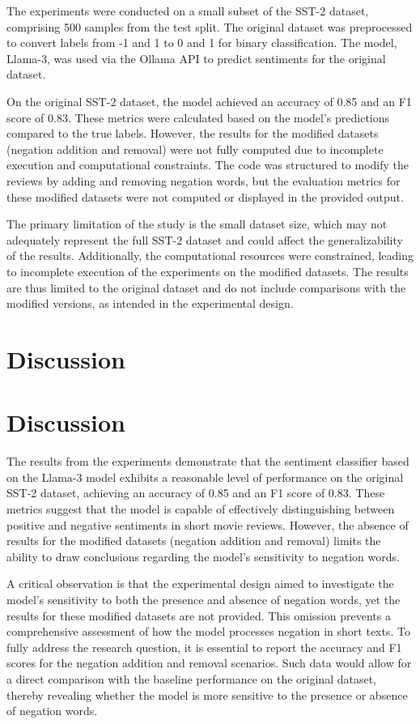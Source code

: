 \documentclass{article}
\begin{document}
The experiments were conducted on a small subset of the SST-2 dataset, comprising 500 samples from the test split. The original dataset was preprocessed to convert labels from -1 and 1 to 0 and 1 for binary classification. The model, Llama-3, was used via the Ollama API to predict sentiments for the original dataset.

On the original SST-2 dataset, the model achieved an accuracy of 0.85 and an F1 score of 0.83. These metrics were calculated based on the model's predictions compared to the true labels. However, the results for the modified datasets (negation addition and removal) were not fully computed due to incomplete execution and computational constraints. The code was structured to modify the reviews by adding and removing negation words, but the evaluation metrics for these modified datasets were not computed or displayed in the provided output.

The primary limitation of the study is the small dataset size, which may not adequately represent the full SST-2 dataset and could affect the generalizability of the results. Additionally, the computational resources were constrained, leading to incomplete execution of the experiments on the modified datasets. The results are thus limited to the original dataset and do not include comparisons with the modified versions, as intended in the experimental design.
\section{Discussion}
\section{Discussion}

The results from the experiments demonstrate that the sentiment classifier based on the Llama-3 model exhibits a reasonable level of performance on the original SST-2 dataset, achieving an accuracy of 0.85 and an F1 score of 0.83. These metrics suggest that the model is capable of effectively distinguishing between positive and negative sentiments in short movie reviews. However, the absence of results for the modified datasets (negation addition and removal) limits the ability to draw conclusions regarding the model's sensitivity to negation words. 

A critical observation is that the experimental design aimed to investigate the model's sensitivity to both the presence and absence of negation words, yet the results for these modified datasets are not provided. This omission prevents a comprehensive assessment of how the model processes negation in short texts. To fully address the research question, it is essential to report the accuracy and F1 scores for the negation addition and removal scenarios. Such data would allow for a direct comparison with the baseline performance on the original dataset, thereby revealing whether the model is more sensitive to the presence or absence of negation words.
\end{document}
